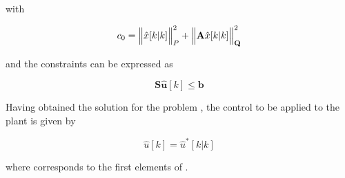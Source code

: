 \noindent
with

\noindent
\begin{equation}
    c_0 = \Big\Vert \hat{x}[k|k]  \Big\Vert^2_{P} + \Big\Vert \mathbf{A} \hat{x}[k|k]  \Big\Vert^2_{\mathbf{Q}} 
    \nonumber
\end{equation}

\noindent
and the constraints can be expressed as

\noindent
\begin{equation}
    \label{eq:cap3:optimization-constraints}
    \mathbf{S} \mathbf{\hat{u}}[k] \leq \mathbf{b}
\end{equation}

Having obtained the solution  for the problem 
, the control to be applied to the plant is given by

\noindent
\begin{equation}
    \hat{u}[k] = \hat{u}^*[k|k]
    \nonumber
\end{equation}

\noindent
where  corresponds to the first  elements of .
